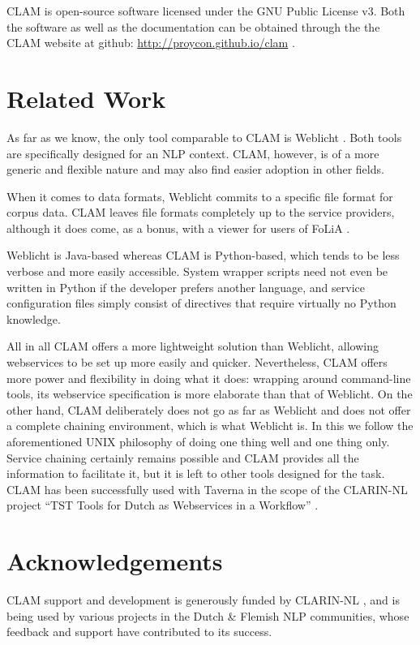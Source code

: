 \documentclass[11pt]{article}
\begin{document}
CLAM is open-source software licensed under the GNU Public License v3. Both the
software as well as the documentation can be obtained through the the CLAM
website at github: \url{http://proycon.github.io/clam} .

\section{Related Work}

As far as we know, the only tool comparable to CLAM is Weblicht
\cite{WEBLICHT}. Both tools are specifically designed for an NLP context. CLAM,
however, is of a more generic and flexible nature and may also find easier
adoption in other fields.

When it comes to data formats, Weblicht commits to a specific file format for
corpus data. CLAM leaves file formats completely up to the service providers,
although it does come, as a bonus, with a viewer for users of FoLiA \cite{FOLIA}.

Weblicht is Java-based whereas CLAM is Python-based, which tends to be less
verbose and more easily accessible. System wrapper scripts need not even be
written in Python if the developer prefers another language, and service
configuration files simply consist of directives that require virtually
no Python knowledge.

All in all CLAM offers a more lightweight solution than Weblicht, allowing
webservices to be set up more easily and quicker. Nevertheless, CLAM offers
more power and flexibility in doing what it does: wrapping around command-line
tools, its webservice specification is more elaborate than that of Weblicht. On
the other hand, CLAM deliberately does not go as far as Weblicht and does not
offer a complete chaining environment, which is what Weblicht is. In this we
follow the aforementioned UNIX philosophy of doing one thing well and one thing
only. Service chaining certainly remains possible and CLAM provides all the
information to facilitate it, but it is left to other tools designed for the
task. CLAM has been successfully used with Taverna \cite{TAVERNA} in the scope
of the CLARIN-NL project ``TST Tools for Dutch as Webservices in a Workflow''
\cite{KEMPSSNIJDERS2012}. 

\section*{Acknowledgements}

CLAM support and development is generously funded by CLARIN-NL \cite{CLARIN}, and is being
used by various projects in the Dutch \& Flemish NLP communities, whose feedback
and support have contributed to its success. 



\end{document}
